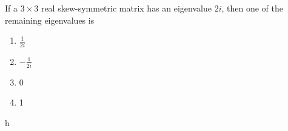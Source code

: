     \item If a $3 \times 3$ real skew-symmetric matrix has an eigenvalue $2i$, then one of the remaining eigenvalues is
    \begin{multicols}{4}
    \begin{enumerate}
        \item $\frac{1}{2i}$
        \item $-\frac{1}{2i}$
        \item 0
        \item 1
    \end{enumerate}
    \end{multicols}
h
